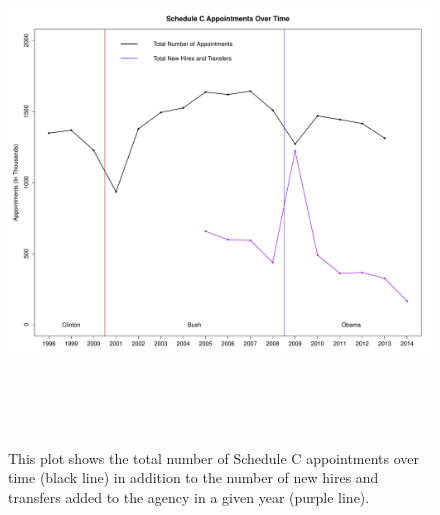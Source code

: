 \documentclass[12pt]{article}
\begin{document}
\newpage
\begin{figure}[!htb]
\begin{center}
\includegraphics[height=5.5in,width=7in]{SCAptsandAccOverTime.pdf}
\caption{This plot shows the total number of Schedule C appointments over time (black line) in addition to the number of new hires and transfers added to the agency in a given year (purple line).}
\end{center}
\end{figure}
\end{document}
